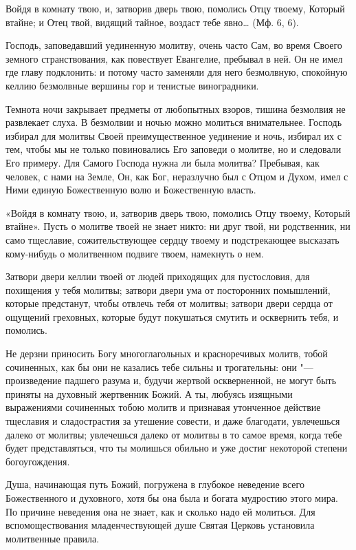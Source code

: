 \begin{mymulticols}

Войдя в комнату твою, и, затворив дверь твою, помолись Отцу твоему, Который втайне; и Отец твой, видящий тайное, воздаст тебе явно… (Мф. 6, 6).

Господь, заповедавший уединенную молитву, очень часто Сам, во время Своего земного странствования, как повествует Евангелие, пребывал в ней. Он не имел где главу подклонить: и потому часто заменяли для него безмолвную, спокойную келлию безмолвные вершины гор и тенистые виноградники.

Темнота ночи закрывает предметы от любопытных взоров, тишина безмолвия не развлекает слуха. В безмолвии и ночью можно молиться внимательнее. Господь избирал для молитвы Своей преимущественное уединение и ночь, избирал их с тем, чтобы мы не только повиновались Его заповеди о молитве, но и следовали Его примеру. Для Самого Господа нужна ли была молитва? Пребывая, как человек, с нами на Земле, Он, как Бог, неразлучно был с Отцом и Духом, имел с Ними единую Божественную волю и Божественную власть.

«Войдя в комнату твою, и, затворив дверь твою, помолись Отцу твоему, Который втайне». Пусть о молитве твоей не знает никто: ни друг твой, ни родственник, ни само тщеславие, сожительствующее сердцу твоему и подстрекающее высказать кому-нибудь о молитвенном подвиге твоем, намекнуть о нем.

Затвори двери келлии твоей от людей приходящих для пустословия, для похищения у тебя молитвы; затвори двери ума от посторонних помышлений, которые предстанут, чтобы отвлечь тебя от молитвы; затвори двери сердца от ощущений греховных, которые будут покушаться смутить и осквернить тебя, и помолись.

Не дерзни приносить Богу многоглагольных и красноречивых молитв, тобой сочиненных, как бы они не казались тебе сильны и трогательны: они "--- произведение падшего разума и, будучи жертвой оскверненной, не могут быть приняты на духовный жертвенник Божий. А ты, любуясь изящными выражениями сочиненных тобою молитв и признавая утонченное действие тщеславия и сладострастия за утешение совести, и даже благодати, увлечешься далеко от молитвы; увлечешься далеко от молитвы в то самое время, когда тебе будет представляться, что ты молишься обильно и уже достиг некоторой степени богоугождения.

Душа, начинающая путь Божий, погружена в глубокое неведение всего Божественного и духовного, хотя бы она была и богата мудростию этого мира. По причине неведения она не знает, как и сколько надо ей молиться. Для вспомоществования младенчествующей душе Святая Церковь установила молитвенные правила.


\end{mymulticols}
